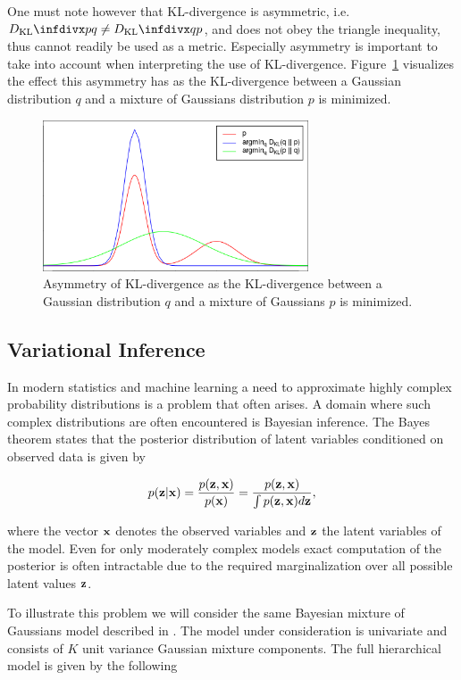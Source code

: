 One must note however that KL-divergence is asymmetric, i.e. $\dkl{p}{q} \neq \dkl{q}{p}$, and does not obey the triangle inequality, thus cannot readily be used as a metric. Especially asymmetry is important to take into account when interpreting the use of KL-divergence. Figure~\ref{fig:kl_divergence} visualizes the effect this asymmetry has as the KL-divergence between a Gaussian distribution $q$ and a mixture of Gaussians distribution $p$ is minimized.

\begin{figure}[!htb]
  \centering
  \includegraphics[width=0.7\textwidth]{images/kl_divergence.png}
  \caption{Asymmetry of KL-divergence as the KL-divergence between a Gaussian distribution $q$ and a mixture of Gaussians $p$ is minimized.}
  \label{fig:kl_divergence}
\end{figure}

\subsection{Variational Inference}
\label{subsection:variational_inference}

In modern statistics and machine learning a need to approximate highly complex probability distributions is a problem that often arises. A domain where such complex distributions are often encountered is Bayesian inference. The Bayes theorem states that the posterior distribution of latent variables conditioned on observed data is given by

$$p(\mathbf{z} \vert \mathbf{x}) = \frac{p(\mathbf{z}, \mathbf{x})}{p(\mathbf{x})} = \frac{p(\mathbf{z}, \mathbf{x})}{\int p(\mathbf{z}, \mathbf{x}) d\mathbf{z}},$$

where the vector $\mathbf{x}$ denotes the observed variables and $\mathbf{z}$ the latent variables of the model. Even for only moderately complex models exact computation of the posterior is often intractable due to the required marginalization over all possible latent values $\mathbf{z}$.

To illustrate this problem we will consider the same Bayesian mixture of Gaussians model described in \cite{variational_inference_review}. The model under consideration is univariate and consists of $K$ unit variance Gaussian mixture components. The full hierarchical model is given by the following

